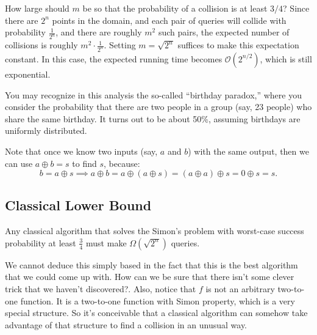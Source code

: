 How large should $m$ be so that the probability of a collision is at least $3/4$? Since there are $2^n$ points in the domain, and each pair of queries will collide with probability $\frac{1}{2^n}$, and there are roughly $m^2$ such pairs, the expected number of collisions is roughly $m^2 \cdot \frac{1}{2^n}$. Setting $m = \sqrt{2^n}$ suffices to make this expectation constant. In this case, the expected running time becomes $\mathcal{O}(2^{n/2})$, which is still exponential.

You may recognize in this analysis the so-called “birthday paradox,” where you consider the probability that there are two people in a group (say, 23 people) who share the same birthday. It turns out to be about 50\%, assuming birthdays are uniformly distributed. 

Note that once we know two inputs (say, $a$ and $b$) with the same output, then we can use $a \oplus b = s$ to find $s$, because:
\[
b = a \oplus s \implies a \oplus b = a \oplus (a \oplus s) = (a \oplus a) \oplus s = 0 \oplus s = s.
\]


\subsection{Classical Lower Bound}
\begin{theorem}
    Any classical algorithm that solves the Simon's problem with worst-case success probability at least $\frac{3}{4}$ must make $\Omega(\sqrt{2^n})$ queries.
\end{theorem}
We cannot deduce this simply based in the fact that this is the best algorithm that we could come up with. How can we be sure that there isn't some clever trick that we haven't discovered?. Also, notice that $f$ is not an arbitrary two-to-one function. It is a two-to-one function with Simon property, which is a very special structure. So it's conceivable that a classical algorithm can somehow take advantage of that structure to find a collision in an unusual way.

